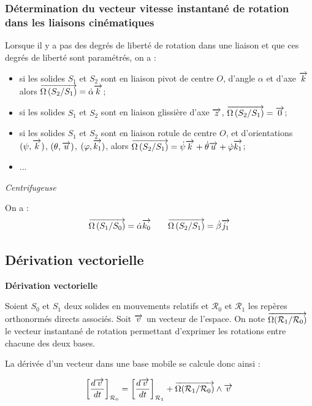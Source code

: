 \documentclass[10pt,oneside]{article}
\begin{document}
\subsubsection{Détermination du vecteur vitesse instantané de rotation dans les liaisons cinématiques}

\begin{resultat}
Lorsque il y a pas des degrés de liberté de rotation dans une liaison et que ces degrés de liberté sont paramétrés, on a :  
\begin{itemize}
\item si les solides $S_1$ et $S_2$ sont en liaison pivot de centre $O$, d'angle $\alpha$ et d'axe $\overrightarrow{k}$ alors $\overrightarrow{\Omega\left( {S_2}/{S_1}\right)}=\dot{\alpha}\overrightarrow{k}$;
\item si les solides $S_1$ et $S_2$ sont en liaison glissière d'axe $\overrightarrow{z}$, $\overrightarrow{\Omega\left( {S_2}/{S_1}\right)}=\overrightarrow{0}$; 
\item si les solides $S_1$ et $S_2$ sont en liaison rotule de centre $O$,  et d'orientations $(\psi,\overrightarrow{k})$, $(\theta,\overrightarrow{u})$, $(\varphi,\overrightarrow{k_1})$, alors $\overrightarrow{\Omega\left( {S_2}/{S_1}\right)}=\dot{\psi}\overrightarrow{k}+\dot{\theta}\overrightarrow{u}+\dot{\varphi}\overrightarrow{k_1}$;
\item ...
\end{itemize}
\end{resultat}

\begin{exemple}
\textit{Centrifugeuse}

On a :
$$
\overrightarrow{\Omega\left( {S_1}/{S_0}\right)} = \dot{\alpha}\overrightarrow{k_0} 
\quad \quad
\overrightarrow{\Omega\left( {S_2}/{S_1}\right)} = \dot{\beta}\overrightarrow{j_1} 
$$

\end{exemple}
\subsection{Dérivation vectorielle}


\begin{resultat}
\textbf{Dérivation vectorielle}

Soient $S_0$ et $S_1$ deux solides en mouvements relatifs et $\mathcal{R}_0$ et $\mathcal{R}_1$ les repères orthonormés directs associés. Soit $\overrightarrow{v}$ un vecteur de l'espace. On note $\overrightarrow{\Omega(\mathcal{R}_1/\mathcal{R}_0)}$ le vecteur instantané de rotation permettant d'exprimer les rotations entre chacune des deux bases. 

La dérivée d'un vecteur dans une base mobile se calcule donc ainsi :

$$
\left[\dfrac{d\overrightarrow{v}}{dt}\right]_{\mathcal{R}_0} =
\left[\dfrac{d\overrightarrow{v}}{dt}\right]_{\mathcal{R}_1} 
+ \overrightarrow{\Omega(\mathcal{R}_1/\mathcal{R}_0)}\wedge \overrightarrow{v}
$$
\end{resultat}
\end{document}
